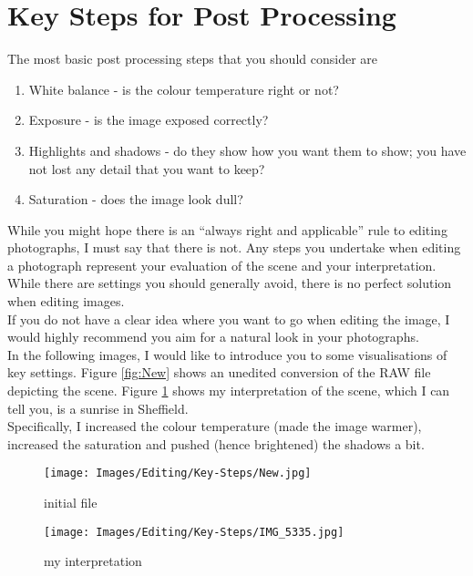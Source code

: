 \section{Key Steps for Post Processing}

The most basic post processing steps that you should consider are

\begin{enumerate}
	\item White balance - is the colour temperature right or not?
	
	\item Exposure - is the image exposed correctly?
	
	\item Highlights and shadows - do they show how you want them to show; you have not lost any detail that you want to keep?
	
	\item Saturation - does the image look dull?
\end{enumerate}

While you might hope there is an ``always right and applicable'' rule to editing photographs, I must say that there is not. Any steps you undertake when editing a photograph represent your evaluation of the scene and your interpretation. While there are settings you should generally avoid, there is no perfect solution when editing images.
\\[\baselineskip]
If you do not have a clear idea where you want to go when editing the image, I would highly recommend you aim for a natural look in your photographs.
\\[\baselineskip]
In the following images, I would like to introduce you to some visualisations of key settings. Figure \ref{fig:New} shows an unedited conversion of the \gls{RAW} file depicting the scene. Figure \ref{fig:IMG_5335} shows my interpretation of the scene, which I can tell you, is a sunrise in Sheffield.
\\
Specifically, I increased the colour temperature (made the image warmer), increased the saturation and pushed (hence brightened) the shadows a bit.

\begin{figure}[htbp]
\begin{minipage}{.5\textwidth}
	\centering
		\texttt{[image: Images/Editing/Key-Steps/New.jpg]}
	\caption{initial file}
	\label{fig:New}
\end{minipage}
\begin{minipage}{.5\textwidth}
	\centering
		\texttt{[image: Images/Editing/Key-Steps/IMG\_5335.jpg]}
	\caption{my interpretation}
	\label{fig:IMG_5335}
\end{minipage}
\end{figure}



